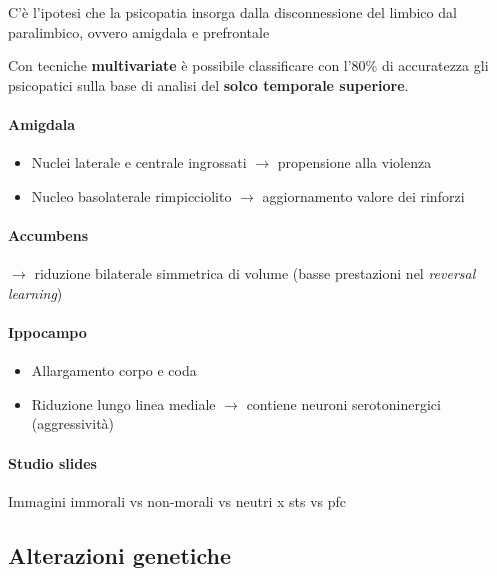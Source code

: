 \documentclass[12pt, a4paper]{article}
\begin{document}
C'è l'ipotesi che la psicopatia insorga dalla disconnessione del limbico dal paralimbico, ovvero amigdala e prefrontale

Con tecniche \textbf{multivariate} è possibile classificare con l'80\% di accuratezza gli psicopatici sulla base di analisi del \textbf{solco temporale superiore}.

\paragraph{Amigdala}  
\begin{itemize}
    \item Nuclei laterale e centrale ingrossati $\rightarrow$ propensione alla violenza
    \item Nucleo basolaterale rimpicciolito $\rightarrow$ aggiornamento valore dei rinforzi
\end{itemize}

\paragraph{Accumbens}  $\rightarrow$ riduzione bilaterale simmetrica di volume (basse presta\-zioni nel \emph{reversal learning})

\paragraph{Ippocampo}  
\begin{itemize}
    \item Allargamento corpo e coda 
    \item Riduzione lungo linea mediale $\rightarrow$ contiene neuroni serotoninergici (aggressività)
\end{itemize}

\paragraph{Studio slides}  Immagini immorali vs non-morali vs neutri x sts vs pfc

\clearpage
\subsection{Alterazioni genetiche} 
\end{document}
